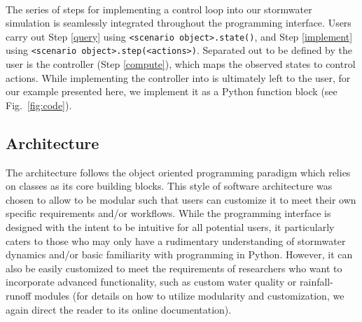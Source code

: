 \

The series of steps for implementing a control loop into our stormwater simulation is seamlessly integrated throughout the \pystorms programming interface. Users carry out Step \ref{query} using \texttt{<scenario object>.\-state()}, and Step \ref{implement} using 
\texttt{<scenario object>.\-step(<actions>)}. Separated out to be defined by the user is the controller (Step \ref{compute}), which maps the observed states to control actions. While implementing the controller into \pystorms is ultimately left to the user, for our example presented here, we implement it as a Python function block (see Fig.~\ref{fig:code}).
%
%
%
\subsection{Architecture}
\label{subsec:architecture}
%
%
%
The \pystorms architecture follows the object oriented programming paradigm which relies on classes as its core building blocks. This style of software architecture was chosen to allow \pystorms to be modular such that users can customize it to meet their own specific requirements and/or workflows.  While the \pystorms programming interface is designed with the intent to be intuitive for all potential users, it particularly caters to those who may only have a rudimentary understanding of stormwater dynamics and/or basic familiarity with programming in Python. However, it can also be easily customized to meet the requirements of researchers who want to incorporate advanced functionality, such as custom water quality or rainfall-runoff modules (for details on how to utilize \pystorms modularity and customization, we again direct the reader to its online documentation). 

\

